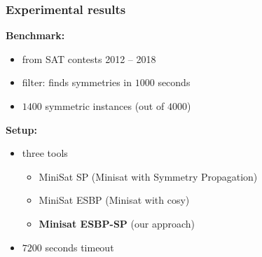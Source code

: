 \documentclass{beamer}
\begin{document}
\begin{frame}
\frametitle{Experimental results}

\textbf{Benchmark:}
\begin{itemize}
	\item from SAT contests 2012 -- 2018
	\item filter: \bliss{} finds  symmetries in $1000$ seconds
	\item $1400$ symmetric instances (out of $4000$)
\end{itemize}

\vfill

\textbf{Setup:}
\begin{itemize}
	\item three tools
	\begin{itemize}
		\item  MiniSat SP (Minisat with Symmetry Propagation)
		\item  MiniSat ESBP (Minisat with cosy)
		\item  \textbf{Minisat ESBP-SP} (our approach)
	\end{itemize}
	\item $7200$ seconds timeout
\end{itemize}

\centering


\end{frame}

\end{document}
